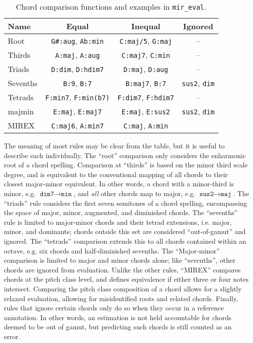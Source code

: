 \begin{table}[t]
\begin{center}
\caption{Chord comparison functions and examples in \texttt{mir\_eval}.}
\label{tab:mir_eval}
\begin{tabular}{l | c | c | c }
Name & Equal & Inequal & Ignored \\
\hline
Root & \texttt{G\#:aug}, \texttt{Ab:min} & \texttt{C:maj/5}, \texttt{G:maj} & -- \\
Thirds & \texttt{A:maj}, \texttt{A:aug} & \texttt{C:maj7}, \texttt{C:min} & --\\
Triads & \texttt{D:dim}, \texttt{D:hdim7} & \texttt{D:maj}, \texttt{D:aug} & -- \\
Sevenths & \texttt{B:9}, \texttt{B:7} & \texttt{B:maj7}, \texttt{B:7} & \texttt{sus2}, \texttt{dim} \\
Tetrads & \texttt{F:min7}, \texttt{F:min(b7)} & \texttt{F:dim7}, \texttt{F:hdim7} & -- \\
majmin & \texttt{E:maj}, \texttt{E:maj7} & \texttt{E:maj}, \texttt{E:sus2} & \texttt{sus2}, \texttt{dim} \\
MIREX & \texttt{C:maj6}, \texttt{A:min7} & \texttt{C:maj}, \texttt{A:min} \\
\hline
\end{tabular}
\end{center}
\end{table}

The meaning of most rules may be clear from the table, but it is useful to describe each individually.
The ``root'' comparison only considers the enharmonic root of a chord spelling.
Comparison at ``thirds'' is based on the minor third scale degree, and is equivalent to the conventional mapping of all chords to their closest major-minor equivalent.
In other words, a chord with a minor-third is minor, e.g. $\texttt{dim7} \to \texttt{min}$, and \emph{all} other chords map to major, e.g. $\texttt{sus2} \to \texttt{maj}$.
The ``triads'' rule considers the first seven semitones of a chord spelling, encompassing the space of major, minor, augmented, and diminished chords.
The ``sevenths'' rule is limited to major-minor chords and their tetrad extensions, i.e. major, minor, and dominants;
chords outside this set are considered ``out-of-gamut'' and ignored.
The ``tetrads'' comparison extends this to all chords contained within an octave, e.g. six chords and half-diminished sevenths.
The ``Major-minor'' comparison is limited to major and minor chords alone;
like ``sevenths'', other chords are ignored from evaluation.
Unlike the other rules, ``MIREX'' compares chords at the pitch class level, and defines equivalence if either three or four notes intersect.
Comparing the pitch class composition of a chord allows for a slightly relaxed evaluation, allowing for misidentified roots and related chords.
Finally, rules that ignore certain chords only do so when they occur in a reference annotation.
In other words, an estimation is not held accountable for chords deemed to be out of gamut, but predicting such chords is still counted as an error.

